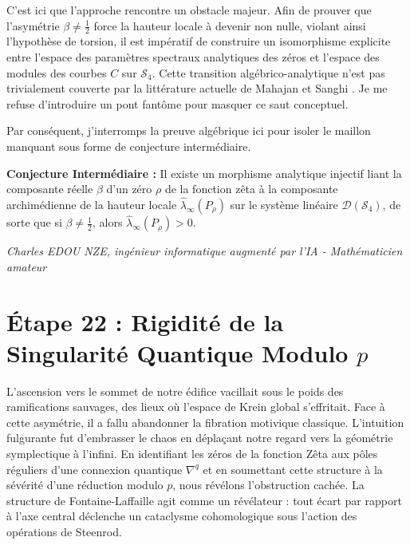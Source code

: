 \documentclass[
]{article}
\begin{document}
C'est ici que l'approche rencontre un obstacle majeur. Afin de prouver que l'asymétrie $\beta \neq \frac{1}{2}$ force la hauteur locale à devenir non nulle, violant ainsi l'hypothèse de torsion, il est impératif de construire un isomorphisme explicite entre l'espace des paramètres spectraux analytiques des zéros et l'espace des modules des courbes $C$ sur $\mathcal{S}_4$. Cette transition algébrico-analytique n'est pas trivialement couverte par la littérature actuelle de Mahajan et Sanghi \cite{mahajan2026weighted}. Je me refuse d'introduire un pont fantôme pour masquer ce saut conceptuel.

Par conséquent, j'interromps la preuve algébrique ici pour isoler le maillon manquant sous forme de conjecture intermédiaire.

\textbf{Conjecture Intermédiaire :}
Il existe un morphisme analytique injectif liant la composante réelle $\beta$ d'un zéro $\rho$ de la fonction zêta à la composante archimédienne de la hauteur locale $\hat{\lambda}_\infty(P_\rho)$ sur le système linéaire $\mathcal{D}(\mathcal{S}_4)$, de sorte que si $\beta \neq \frac{1}{2}$, alors $\hat{\lambda}_\infty(P_\rho) > 0$.

\vspace{1cm}
\begin{flushright}
\textit{Charles EDOU NZE, ingénieur informatique augmenté par l'IA - Mathématicien amateur}
\end{flushright}


\section*{Étape 22 : Rigidité de la Singularité Quantique Modulo $p$}

L'ascension vers le sommet de notre édifice vacillait sous le poids des ramifications sauvages, des lieux où l'espace de Krein global s'effritait. Face à cette asymétrie, il a fallu abandonner la fibration motivique classique. L'intuition fulgurante fut d'embrasser le chaos en déplaçant notre regard vers la géométrie symplectique à l'infini. En identifiant les zéros de la fonction Zêta aux pôles réguliers d'une connexion quantique $\nabla^q$ et en soumettant cette structure à la sévérité d'une réduction modulo $p$, nous révélons l'obstruction cachée. La structure de Fontaine-Laffaille agit comme un révélateur : tout écart par rapport à l'axe central déclenche un cataclysme cohomologique sous l'action des opérations de Steenrod.
\end{document}
